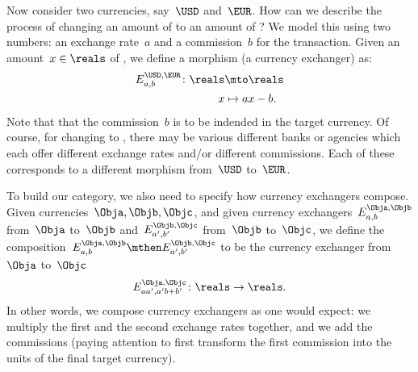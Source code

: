 Now consider two currencies, say~$\USD$ and~$\EUR$.
How can we describe the process of changing an amount of \USD to an amount of \EUR?
We model this using two numbers: an exchange rate~$a$ and a commission~$b$ for the transaction.
Given an amount~$x \in \reals$ of \USD, we define a morphism (a currency exchanger) as:
\begin{equation*}
    \label{eq:def_curr_ex}
    \begin{aligned}
        E_{a,b}^{\USD,\EUR} \colon \reals & \mto \reals     \\
        x                                 & \mapsto ax - b.
    \end{aligned}
\end{equation*}
Note that that the commission~$b$ is to be indended in the target currency.
Of course, for changing \USD to \EUR, there may be various different banks or agencies which each offer different exchange rates and/or different commissions.
Each of these corresponds to a different morphism from~$\USD$ to~$\EUR$.


To build our category, we also need to specify how currency exchangers compose.
Given currencies~$\Obja, \Objb, \Objc$, and given currency exchangers~$E_{a,b}^{\Obja,\Objb}$ from~$\Obja$ to~$\Objb$ and~$E_{a',b'}^{\Objb,\Objc}$ from~$\Objb$ to~$\Objc$,
we define the composition~$E_{a,b}^{\Obja,\Objb} \mthen E_{a',b'}^{\Objb,\Objc}$ to be the currency exchanger from~$\Obja$ to~$\Objc$
\begin{equation}
    \label{eq:comp-law-curr}
    E_{aa',a'b + b'}^{\Obja,\Objc} \colon \reals \to \reals.
\end{equation}
In other words, we compose currency exchangers as one would expect: we multiply the first and the second exchange rates together, and we add the commissions (paying attention to first transform the first commission into the units of the final target currency).

